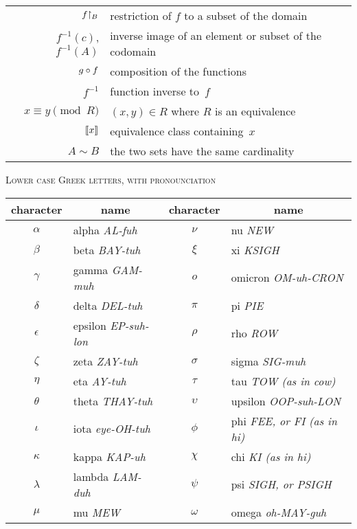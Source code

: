 \documentclass{ibl}
\begin{document}
\begin{center}
\begin{tabular}{r|l}
    ${f}\mathord\upharpoonright_{B}$  &restriction of $f$ to a subset of the domain \\
    $f^{-1}(c)$, $f^{-1}(A)$  &inverse image of an element or subset of the codomain \\
    $g\mathbin{\circ} f$  &composition of the functions  \\
    $f^{-1}$  &function inverse to~$f$  \\
    $x\equiv y\pmod R$  &$(x,y)\in R$ where $R$ is an equivalence \\ 
    $\llbracket x \rrbracket$  &equivalence class containing~$x$  \\
    $A\sim B$  &the two sets have the same cardinality
  \end{tabular}
\end{center}
\vspace*{\fill}
\begin{center}
  {\large\textsc{Lower case Greek letters, with pronounciation}}
    \\[3ex]
  \newcommand{\pronounced}[1]{\hspace*{.2em}\small\textit{#1}}
  \begin{tabular}{cl@{\hspace*{3em}}cl}
    character &\multicolumn{1}{c}{name}       
    &character  &\multicolumn{1}{c}{name}  \\ 
    \hline
     \( \alpha  \) &alpha \pronounced{AL-fuh}  
       &\( \nu     \)  &nu  \pronounced{NEW}       \\
     \( \beta   \) &beta  \pronounced{BAY-tuh}     
       &\( \xi  \)  &xi   \pronounced{KSIGH}    \\ 
     \( \gamma  \) &gamma  \pronounced{GAM-muh}    
       &\( o       \) &omicron  \pronounced{OM-uh-CRON}  \\
     \( \delta  \) &delta  \pronounced{DEL-tuh}   
       &\( \pi \) &pi  \pronounced{PIE}     \\
     \( \epsilon\) &epsilon  \pronounced{EP-suh-lon}   
       &\( \rho \) &rho  \pronounced{ROW}    \\
     \( \zeta   \) &zeta   \pronounced{ZAY-tuh}    
       &\( \sigma  \) &sigma  \pronounced{SIG-muh}  \\
     \( \eta    \) &eta  \pronounced{AY-tuh}      
       &\( \tau \) &tau  \pronounced{TOW (as in cow)}    \\
     \( \theta  \) &theta  \pronounced{THAY-tuh}    
       &\( \upsilon\) &upsilon  \pronounced{OOP-suh-LON}  \\
     \( \iota \) &iota \pronounced{eye-OH-tuh}   
       &\( \phi    \) &phi  \pronounced{FEE, or FI (as in hi)}    \\
     \( \kappa  \) &kappa  \pronounced{KAP-uh}  
       &\( \chi    \) &chi  \pronounced{KI (as in hi)}    \\
     \( \lambda \) &lambda  \pronounced{LAM-duh}  
       &\( \psi    \) &psi \pronounced{SIGH, or PSIGH}    \\
     \( \mu  \)  &mu  \pronounced{MEW}     
       &\( \omega  \) &omega  \pronounced{oh-MAY-guh}  
  \end{tabular}
\end{center}
\end{document}

